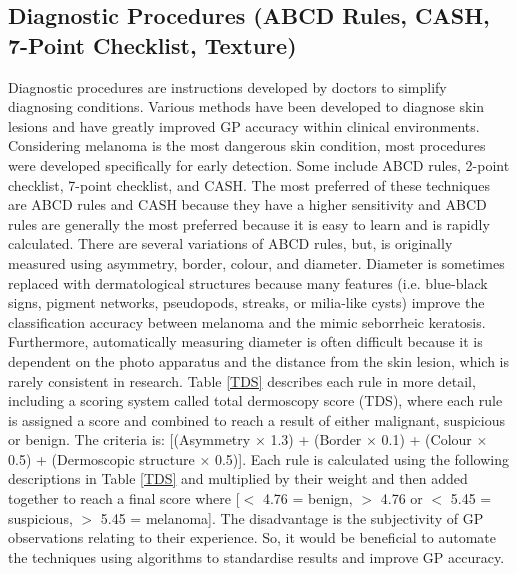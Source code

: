 \subsection{Diagnostic Procedures (ABCD Rules, CASH, 7-Point Checklist, Texture)}
Diagnostic procedures are instructions developed by doctors to simplify diagnosing conditions. Various methods have been developed to diagnose skin lesions and have greatly improved GP accuracy within clinical environments\cite{Nachbar1994, unlu2014}. Considering melanoma is the most dangerous skin condition, most procedures were developed specifically for early detection. Some include ABCD rules, 2-point checklist, 7-point checklist, and CASH. The most preferred of these techniques are ABCD rules and CASH because they have a higher sensitivity\cite{unlu2014} and ABCD rules are generally the most preferred because it is easy to learn and is rapidly calculated\cite{Nachbar1994}. There are several variations of ABCD rules, but, is originally measured using asymmetry, border, colour, and diameter. Diameter is sometimes replaced with dermatological structures because many features (i.e. blue-black signs, pigment networks, pseudopods, streaks, or milia-like cysts\cite{Stricklin2011}) improve the classification accuracy between melanoma and the mimic seborrheic keratosis\cite{Cognetta1994}. Furthermore, automatically measuring diameter is often difficult because it is dependent on the photo apparatus and the distance from the skin lesion, which is rarely consistent in research. Table \ref{TDS} describes each rule in more detail, including a scoring system called total dermoscopy score (TDS), where each rule is assigned a score and combined to reach a result of either malignant, suspicious or benign. The criteria is: [(Asymmetry $\times$ 1.3) + (Border $\times$ 0.1) + (Colour $\times$ 0.5) + (Dermoscopic structure $\times$ 0.5)]. Each rule is calculated using the following descriptions in Table \ref{TDS} and multiplied by their weight and then added together to reach a final score where [$<$ 4.76 = benign, $>$ 4.76 or $<$ 5.45 = suspicious, $>$ 5.45 = melanoma]. The disadvantage is the subjectivity of GP observations relating to their experience. So, it would be beneficial to automate the techniques using algorithms to standardise results and improve GP accuracy.


